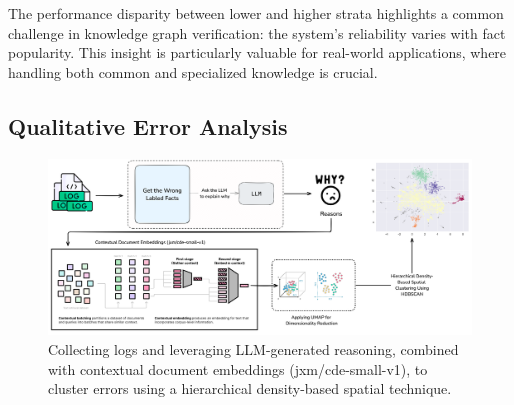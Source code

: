 The performance disparity between lower and higher strata highlights a common challenge in knowledge graph verification: the system's reliability varies with fact popularity.
This insight is particularly valuable for real-world applications, where handling both common and specialized knowledge is crucial.

\subsection{Qualitative Error Analysis}\label{subsec:empirical-evaluation:discussion-of-results:error-analysis}
\begin{figure}[ht!]
    \centering
    \begin{minipage}[b]{\textwidth}
        \centering
        \includegraphics[width=\textwidth]{res/clustering}
    \end{minipage}
    \caption{Collecting logs and leveraging LLM-generated reasoning, combined with contextual document embeddings (jxm/cde-small-v1), to cluster errors using a hierarchical density-based spatial technique.}
    \label{fig:error-clustering-task}
\end{figure}

